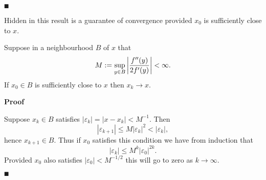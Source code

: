 \ensuremath{\QED}

Hidden in this result is a guarantee of convergence provided $x_0$ is sufficiently close to $x$.

\begin{corollary} Suppose in a  neighbourhood $B$ of $x$ that
\[
M := \sup_{y \ensuremath{\in} B}  \left| {f''(y) \over 2f'(y)} \right| < \ensuremath{\infty}.
\]
If $x_0 \ensuremath{\in} B$ is sufficiently close to $x$ then $x_k \ensuremath{\rightarrow} x$.

\end{corollary}
\textbf{Proof}

Suppose $x_k \ensuremath{\in} B$ satisfies $|\ensuremath{\varepsilon}_k| = |x-x_k| < M^{-1}$. Then
\[
|\ensuremath{\varepsilon}_{k+1}| \ensuremath{\leq} M |\ensuremath{\varepsilon}_k|^2 < |\ensuremath{\varepsilon}_k|,
\]
hence $x_{k+1} \ensuremath{\in} B$. Thus if $x_0$ satisfies this condition we have from induction that
\[
|\ensuremath{\varepsilon}_k| \ensuremath{\leq} M^k |\ensuremath{\varepsilon}_0|^{2k}.
\]
Provided $x_0$ also satisfies $|\ensuremath{\varepsilon}_0| < M^{-1/2}$ this will go to zero as $k \ensuremath{\rightarrow} \ensuremath{\infty}$.

\ensuremath{\QED}



